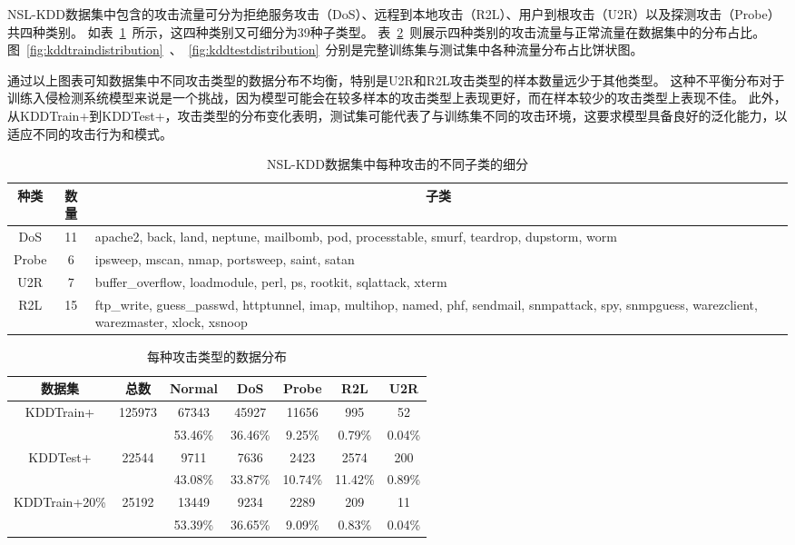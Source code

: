 NSL-KDD数据集中包含的攻击流量可分为拒绝服务攻击（DoS）、远程到本地攻击（R2L）、用户到根攻击（U2R）以及探测攻击（Probe）共四种类别。
如表~\ref{tab:attack_class}~所示，这四种类别又可细分为39种子类型。
表~\ref{tab:kdd_distribution}~则展示四种类别的攻击流量与正常流量在数据集中的分布占比。
图~\ref{fig:kddtraindistribution}~、~\ref{fig:kddtestdistribution}~分别是完整训练集与测试集中各种流量分布占比饼状图。


通过以上图表可知数据集中不同攻击类型的数据分布不均衡，特别是U2R和R2L攻击类型的样本数量远少于其他类型。
这种不平衡分布对于训练入侵检测系统模型来说是一个挑战，因为模型可能会在较多样本的攻击类型上表现更好，而在样本较少的攻击类型上表现不佳。
此外，从KDDTrain+到KDDTest+，攻击类型的分布变化表明，测试集可能代表了与训练集不同的攻击环境，这要求模型具备良好的泛化能力，以适应不同的攻击行为和模式。


\begin{table}[htbp]
  \caption{NSL-KDD数据集中每种攻击的不同子类的细分}
  \label{tab:attack_class}
  \begin{tabularx}{\textwidth}{@{}ccX@{}}
  \toprule
    \multicolumn{1}{c}{\textbf{种类}} & \multicolumn{1}{c}{\textbf{数量}} & \multicolumn{1}{c}{\textbf{子类}}\\
  \midrule
    DoS & 11 & apache2, back, land, neptune, mailbomb, pod, processtable, smurf, teardrop, dupstorm, worm\\
    Probe & 6 & ipsweep, mscan, nmap, portsweep, saint, satan\\
    U2R & 7 & buffer\_overflow, loadmodule, perl, ps, rootkit, sqlattack, xterm\\
    R2L & 15 & ftp\_write, guess\_passwd, httptunnel, imap, multihop, named, phf, sendmail, snmpattack, spy, snmpguess, warezclient, warezmaster, xlock, xsnoop\\
  \bottomrule
  \end{tabularx}
\end{table}

\begin{table}[htbp]
  \caption{每种攻击类型的数据分布}
  \label{tab:kdd_distribution}
  \centering
  \begin{tabular}{ccccccc}
  \toprule
  \textbf{数据集} & \textbf{总数} & \textbf{Normal} & \textbf{DoS} & \textbf{Probe} & \textbf{R2L} & \textbf{U2R}\\
  \midrule
  \multirow{2}{*}{KDDTrain+} & \multirow{2}{*}{125973} & 67343 & 45927 & 11656 & 995  & 52   \\
                             &                          &53.46\%& 36.46\% & 9.25\%&0.79\%&0.04\%\\
  \multirow{2}{*}{KDDTest+} & \multirow{2}{*}{22544} & 9711 & 7636 & 2423 & 2574 & 200\\
                            &                           & 43.08\% & 33.87\%& 10.74\%& 11.42\%&0.89\%\\
  \multirow{2}{*}{KDDTrain+20\%} & \multirow{2}{*}{25192} & 13449 & 9234 & 2289 & 209 & 11\\
                                 &                      & 53.39\% & 36.65\%& 9.09\%& 0.83\%&0.04\%\\
  \bottomrule
  \end{tabular}
\end{table}

